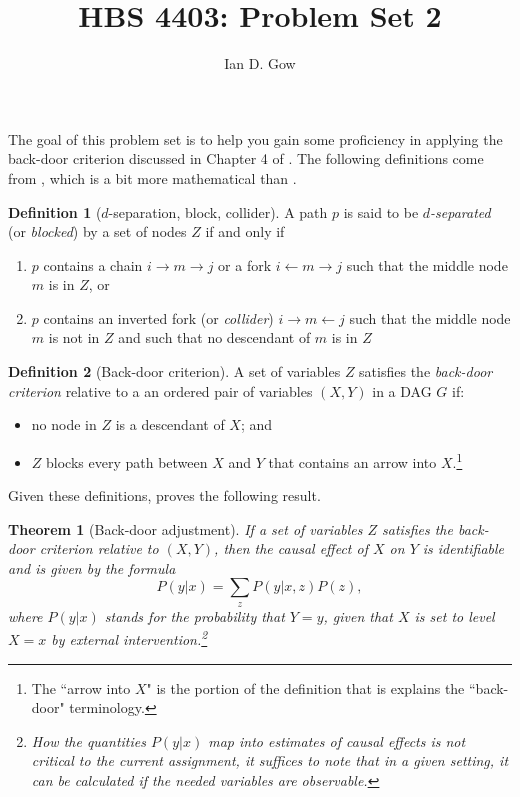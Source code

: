 \documentclass[11pt]{amsart}
\title[HBS 4403: Management Control and Performance Measurement]{HBS 4403: Problem Set 2}
\author{Ian D. Gow}
\newtheorem{theorem}{Theorem}
\theoremstyle{definition}
\newtheorem{definition}{Definition}
\theoremstyle{question}
\begin{document}
\usetikzlibrary{automata, shapes, calc, positioning}
\maketitle



The goal of this problem set is to help you gain some proficiency in applying the back-door criterion discussed in Chapter 4 of \citet{Morgan:2014vg}. 
The following definitions come from \citet{Pearl:2009vo}, which is a bit more mathematical than \citet{Morgan:2014vg}.

\begin{definition}[$d$-separation, block, collider]
A path $p$ is said to be \emph{$d$-separated} (or \emph{blocked}) by a set of nodes $Z$ if and only if
\begin{enumerate}
	\item $p$ contains a chain $i \rightarrow m \rightarrow j$ or a fork $i \leftarrow m \rightarrow j$ such that the middle node $m$ is in $Z$, or
	\item $p$ contains an inverted fork (or \emph{collider}) $i \rightarrow m \leftarrow j$ such that the middle node $m$ is not in $Z$ and such that no descendant of $m$ is in $Z$
\end{enumerate}
\end{definition}

\begin{definition}[Back-door criterion]
A set of variables $Z$ satisfies the \emph{back-door criterion} relative to a an ordered pair of variables $(X, Y)$ in a 
	DAG $G$ if:
	\begin{itemize}
		\item no node in $Z$ is a descendant of $X$; and
		\item $Z$ blocks every path between $X$ and $Y$ that contains an arrow into $X$.\footnote{The ``arrow into $X$" is the portion of the definition that is explains the ``back-door" terminology.}
	\end{itemize}
\end{definition}

Given these definitions, \citet[p.\,79]{Pearl:2009vo}
proves the following result.
\begin{theorem}[Back-door adjustment]
	If a set of variables $Z$ satisfies the back-door criterion relative to $(X, Y)$, then the causal effect of $X$ on $Y$ is identifiable and is given by the formula 
	\[ P(y | x) = \sum_{z} P(y | x, z) P(z), \]
where $P(y|x)$ stands for the probability that $Y = y$, given that $X$ is set to level $X=x$ by external intervention.\footnote{
How the quantities $P(y|x)$ map into estimates of causal effects is not critical to the current assignment, it suffices to note that in a given setting, it can be calculated if the needed variables are observable.}
\end{theorem}
\end{document}

